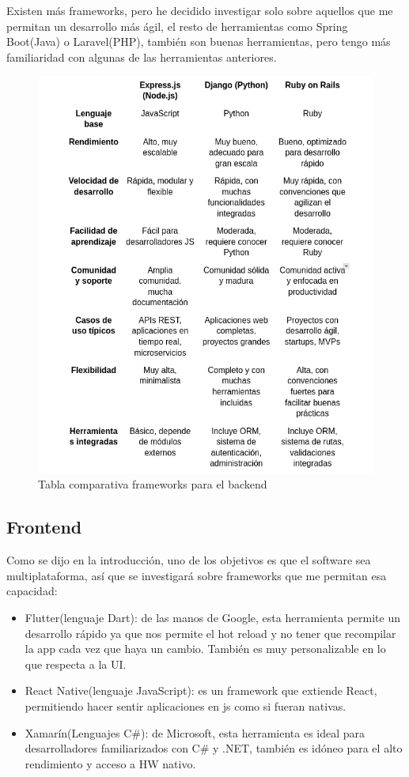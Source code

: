 Existen más frameworks, pero he decidido investigar solo sobre aquellos que me permitan un desarrollo más ágil, el resto de herramientas como Spring Boot(Java) o Laravel(PHP), también son buenas herramientas, pero tengo más familiaridad con algunas de las herramientas anteriores.

\begin{figure}[H]
   \centering
    \includegraphics[width=\textwidth]{tablas/Backend.png}
    \caption{Tabla comparativa frameworks para el backend}
    \label{fig:Tabla backend}
\end{figure}

\subsection{Frontend}

Como se dijo en la introducción, uno de los objetivos es que el software sea multiplataforma, así que se investigará sobre frameworks que me permitan esa capacidad:

\begin{itemize}
	\item Flutter(lenguaje Dart): de las manos de Google, esta herramienta permite un desarrollo rápido ya que nos permite el hot reload y no tener que recompilar la app cada vez que haya un cambio. También es muy personalizable en lo que respecta a la UI.
	\item React Native(lenguaje JavaScript): es un framework que extiende React, permitiendo hacer sentir aplicaciones en js como si fueran nativas.
	\item Xamarín(Lenguajes C\#): de Microsoft, esta herramienta es ideal para desarrolladores familiarizados con C\# y .NET, también es idóneo para el alto rendimiento y acceso a HW nativo.
\end{itemize}

